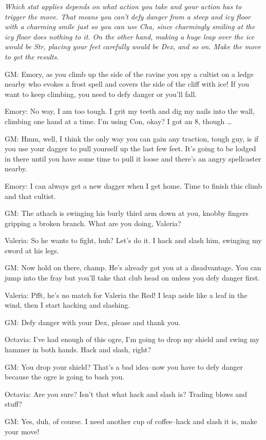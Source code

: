 {\itshape
Which stat applies depends on what action you take and your action has to trigger the move. That means you can't defy danger from a steep and icy floor with a charming smile just so you can use Cha, since charmingly smiling at the icy floor does nothing to it. On the other hand, making a huge leap over the ice would be Str, placing your feet carefully would be Dex, and so on. Make the move to get the results.

GM: Emory, as you climb up the side of the ravine you spy a cultist on a ledge nearby who evokes a frost spell and covers the side of the cliff with ice! If you want to keep climbing, you need to defy danger or you'll fall.

Emory: No way, I am too tough. I grit my teeth and dig my nails into the wall, climbing one hand at a time. I'm using Con, okay? I got an 8, though \ldots 

GM: Hmm, well, I think the only way you can gain any traction, tough guy, is if you use your dagger to pull yourself up the last few feet. It's going to be lodged in there until you have some time to pull it loose and there's an angry spellcaster nearby.

Emory: I can always get a new dagger when I get home. Time to finish this climb and that cultist.

GM: The athach is swinging his burly third arm down at you, knobby fingers gripping a broken branch. What are you doing, Valeria?

Valeria: So he wants to fight, huh? Let's do it. I hack and slash him, swinging my sword at his legs.

GM: Now hold on there, champ. He's already got you at a disadvantage. You can jump into the fray but you'll take that club head on unless you defy danger first.

Valeria: Pfft, he's no match for Valeria the Red! I leap aside like a leaf in the wind, then I start hacking and slashing.

GM: Defy danger with your Dex, please and thank you.

Octavia: I've had enough of this ogre, I'm going to drop my shield and swing my hammer in both hands. Hack and slash, right?

GM: You drop your shield? That's a bad idea--now you have to defy danger because the ogre is going to bash you.

Octavia: Are you sure? Isn't that what hack and slash is? Trading blows and stuff?

GM: Yes, duh, of course. I need another cup of coffee--hack and slash it is, make your move!
}
